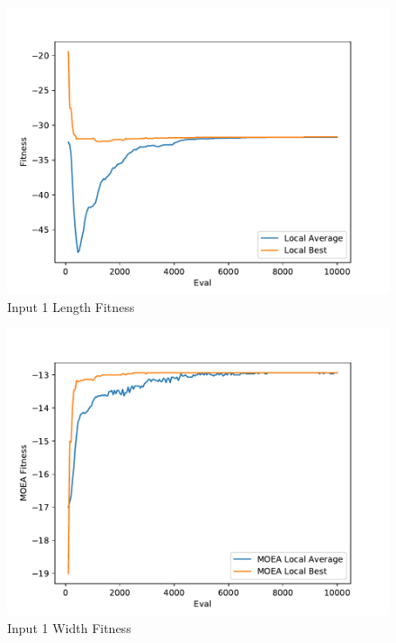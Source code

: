 \documentclass{standalone}
\begin{document}
\begin{figure}[!htb]
	\caption{Input 1 Length Fitness}
	\label{fig:graph_1002}
	\includegraphics[width=\textwidth]{../graphs/graphs/1002.pdf}
\end{figure}


\begin{figure}[!htb]
	\caption{Input 1 Width Fitness}
	\label{fig:graph_1002_moea}
	\includegraphics[width=\textwidth]{../graphs/graphs/1002_moea.pdf}
\end{figure}
\end{document}
